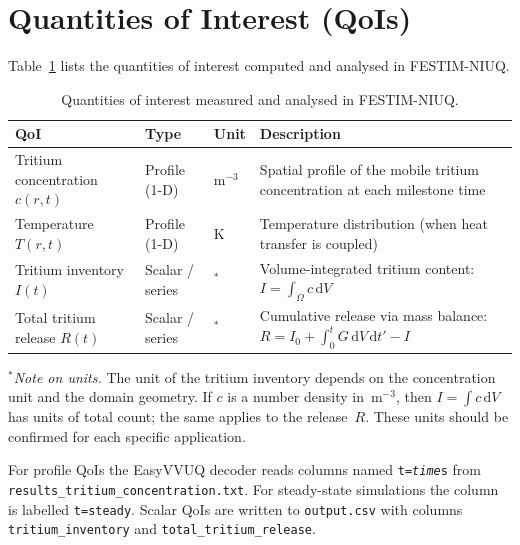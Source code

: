 \documentclass[11pt,a4paper]{article}
\begin{document}
\section{Quantities of Interest (QoIs)}
\label{sec:qois}

Table~\ref{tab:qois} lists the quantities of interest computed and
analysed in FESTIM-NIUQ.

\begin{table}[htbp]
\centering
\caption{Quantities of interest measured and analysed in FESTIM-NIUQ.}
\label{tab:qois}
\small
\begin{tabularx}{\textwidth}{@{} l l l X @{}}
\toprule
\textbf{QoI} & \textbf{Type} & \textbf{Unit} & \textbf{Description} \\
\midrule
Tritium concentration $c(r,t)$   & Profile (1-D)   & $\mathrm{m^{-3}}$   & Spatial profile of the mobile tritium concentration at each milestone time \\
Temperature $T(r,t)$             & Profile (1-D)   & K                    & Temperature distribution (when heat transfer is coupled) \\
Tritium inventory $I(t)$         & Scalar / series  & $^\ast$              & Volume-integrated tritium content: $I = \int_\Omega c\,\mathrm{d}V$ \\
Total tritium release $R(t)$     & Scalar / series  & $^\ast$              & Cumulative release via mass balance: $R = I_0 + \int_0^t G\,\mathrm{d}V\,\mathrm{d}t' - I$ \\
\bottomrule
\end{tabularx}
\end{table}

\noindent
$^\ast$\textit{Note on units.}  The unit of the tritium inventory depends on
the concentration unit and the domain geometry.  If $c$ is a number density
in~$\mathrm{m^{-3}}$, then $I = \int c\,\mathrm{d}V$ has units of total
count; the same applies to the release~$R$.  These units should be
confirmed for each specific application.

\medskip\noindent
For profile QoIs the EasyVVUQ decoder reads columns named
\texttt{t=\textit{time}s} from \texttt{results\_tritium\_concentration.txt}.
For steady-state simulations the column is labelled \texttt{t=steady}.
Scalar QoIs are written to \texttt{output.csv} with columns
\texttt{tritium\_inventory} and \texttt{total\_tritium\_release}.
\end{document}
